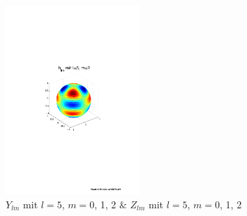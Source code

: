 \begin{refsection}
\begin{figure}
\includegraphics[width=0.45\textwidth]{kugel/ylm/b_5_2.pdf}
\caption{$Y_{lm}$ mit $l=5$, $m=0$, 1, 2 $\&$ $Z_{lm}$ mit $l=5$, $m=0$, 1, 2
\label{skript:Bild 0}}
\end{figure}


\end{refsection}

